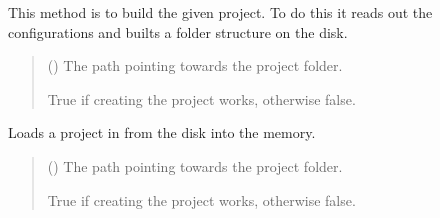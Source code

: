 \documentclass[letterpaper,10pt,english]{sphinxmanual}
\begin{document}
\begin{fulllineitems}
\begin{fulllineitems}
\label{\detokenize{apidoc/src.osm_configurator.model.project:src.osm_configurator.model.project.project_io_handler.ProjectIOHandler.build_project}}
\pysigstartsignatures
{}
\pysigstopsignatures
\sphinxAtStartPar
This method is to build the given project. To do this it reads out the configurations and builts a folder
structure on the disk.
\begin{quote}\begin{description}
\sphinxAtStartPar
{} () \textendash{} The path pointing towards the project folder.

\sphinxAtStartPar
True if creating the project works, otherwise false.

\sphinxAtStartPar
{}

\end{description}\end{quote}

\end{fulllineitems}


\begin{fulllineitems}
\label{\detokenize{apidoc/src.osm_configurator.model.project:src.osm_configurator.model.project.project_io_handler.ProjectIOHandler.load_project}}
\pysigstartsignatures
{}
\pysigstopsignatures
\sphinxAtStartPar
Loads a project in from the disk into the memory.
\begin{quote}\begin{description}
\sphinxAtStartPar
{} () \textendash{} The path pointing towards the project folder.

\sphinxAtStartPar
True if creating the project works, otherwise false.

\sphinxAtStartPar
{}

\end{description}\end{quote}

\end{fulllineitems}


\end{fulllineitems}
\end{document}
